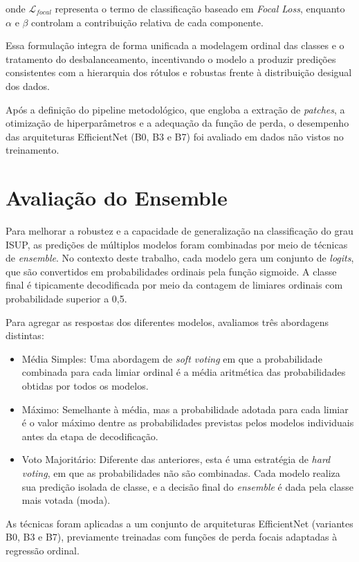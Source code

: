 onde $\mathcal{L}_{focal}$ representa o termo de classificação baseado em \textit{Focal Loss}, enquanto $\alpha$ e $\beta$ controlam a contribuição relativa de cada componente.

Essa formulação integra de forma unificada a modelagem ordinal das classes e o tratamento do desbalanceamento, incentivando o modelo a produzir predições consistentes com a hierarquia dos rótulos e robustas frente à distribuição desigual dos dados.

Após a definição do pipeline metodológico, que engloba a extração de \textit{patches}, a otimização de hiperparâmetros e a adequação da função de perda, o desempenho das arquiteturas EfficientNet (B0, B3 e B7) foi avaliado em dados não vistos no treinamento.

\section{Avaliação do Ensemble}
\label{sec:ensemble}
Para melhorar a robustez e a capacidade de generalização na classificação do grau ISUP, as predições de múltiplos modelos foram combinadas por meio de técnicas de \textit{ensemble}. No contexto deste trabalho, cada modelo gera um conjunto de \textit{logits}, que são convertidos em probabilidades ordinais pela função sigmoide. A classe final é tipicamente decodificada por meio da contagem de limiares ordinais com probabilidade superior a 0,5.

Para agregar as respostas dos diferentes modelos, avaliamos três abordagens distintas:

\begin{itemize}
	\item Média Simples: Uma abordagem de \textit{soft voting} em que a probabilidade combinada para cada limiar ordinal é a média aritmética das probabilidades obtidas por todos os modelos.
	
	\item Máximo: Semelhante à média, mas a probabilidade adotada para cada limiar é o valor máximo dentre as probabilidades previstas pelos modelos individuais antes da etapa de decodificação.
	
	\item Voto Majoritário: Diferente das anteriores, esta é uma estratégia de \textit{hard voting}, em que as probabilidades não são combinadas. Cada modelo realiza sua predição isolada de classe, e a decisão final do \textit{ensemble} é dada pela classe mais votada (moda).
\end{itemize}

As técnicas foram aplicadas a um conjunto de arquiteturas EfficientNet (variantes B0, B3 e B7), previamente treinadas com funções de perda focais adaptadas à regressão ordinal. 